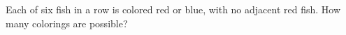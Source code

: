 Each of six fish in a row is colored red or blue, with no adjacent red fish. How many colorings are possible?
